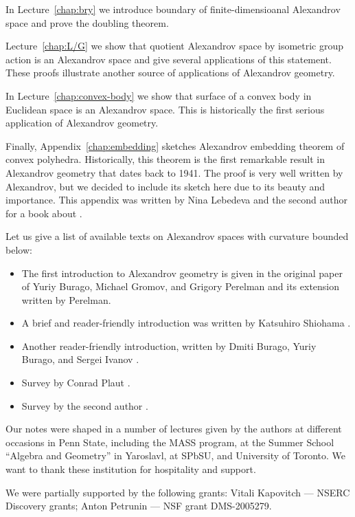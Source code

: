 In Lecture~\ref{chap:bry} we introduce boundary of finite-dimensioanal Alexandrov space and prove the doubling theorem.

Lecture~\ref{chap:L/G} we show that quotient Alexandrov space by isometric group action is an Alexandrov space and give several applications of this statement.
These proofs illustrate another source of applications of Alexandrov geometry.

In Lecture~\ref{chap:convex-body} we show that surface of a convex body in Euclidean space is an Alexandrov space. This is historically the first serious application of Alexandrov geometry.

Finally, Appendix~\ref{chap:embedding} sketches Alexandrov embedding theorem of convex polyhedra.
Historically, this theorem is the first remarkable result in Alexandrov geometry that dates back to 1941.
The proof is very well written by Alexandrov, but we decided to include its sketch here due to its beauty and importance.
This appendix was written by Nina Lebedeva and the second author for a book about .

Let us give a list of available texts on Alexandrov spaces with curvature bounded below: 
\begin{itemize}
\item The first introduction to Alexandrov geometry is given in the original paper of Yuriy Burago, Michael Gromov, and Grigory Perelman \cite{burago-gromov-perelman} 
and its extension \cite{perelman1991} written by Perelman.
\item A brief and reader-friendly introduction was written by Katsuhiro Shiohama \cite[Sections 1--8]{shiohama}.
\item Another reader-friendly introduction, written by Dmiti Burago, Yuriy
Burago, and Sergei Ivanov \cite[Chapter 10]{burago-burago-ivanov}.
\item Survey by Conrad Plaut \cite{plaut:survey}.
\item Survey by the second author \cite{petrunin:survey}.
\end{itemize}

Our notes were shaped in a number of lectures given by the authors
at different occasions in Penn State, including the MASS program,
at the Summer School ``Algebra and Geometry'' in Yaroslavl,
at SPbSU,
and University of Toronto.
We want to thank these institution for hospitality and support.

We were partially supported by the following grants:
Vitali Kapovitch ---   NSERC Discovery grants;
Anton Petrunin --- 
NSF grant DMS-2005279. %


